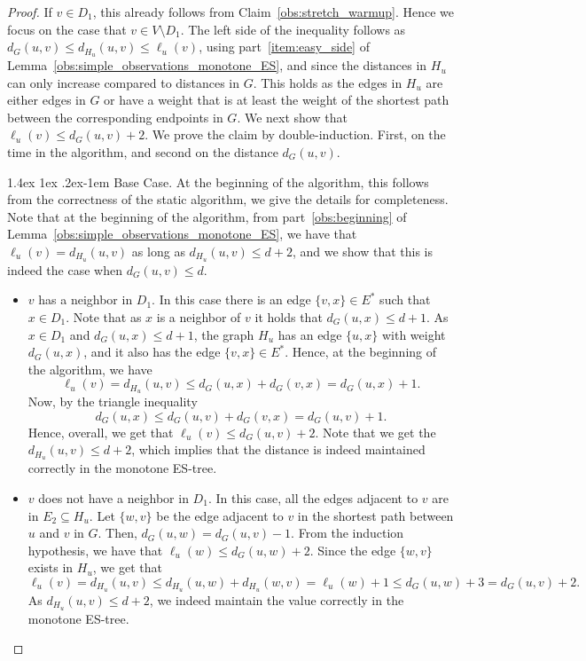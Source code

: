 \documentclass[11pt]{article}
\makeatletter
\theoremstyle{definition}
\theoremstyle{remark}
\renewcommand{\paragraph}{%
  \@startsection{paragraph}{4}%
  {\z@}{1.4ex \@plus 1ex \@minus .2ex}{-1em}%
  {\normalfont\normalsize\bfseries}%
}
\makeatother
\begin{document}
\begin{proof}
If $v \in D_1$, this already follows from Claim~\ref{obs:stretch_warmup}. Hence we focus on the case that $v \in V \setminus D_1$. The left side of the inequality follows as $d_G(u,v) \leq d_{H_u}(u,v) \leq \ell_u(v)$, using part~\ref{item:easy_side} of Lemma~\ref{obs:simple_observations_monotone_ES}, and since the distances in $H_u$ can only increase compared to distances in $G$. This holds as the edges in $H_u$ are either edges in $G$ or have a weight that is at least the weight of the shortest path between the corresponding endpoints in $G$.
We next show that $\ell_u(v) \leq d_G(u,v) +2$.
We prove the claim by double-induction. First, on the time in the algorithm, and second on the distance $d_G(u,v)$.

\paragraph{Base Case.} At the beginning of the algorithm, this follows from the correctness of the static algorithm, we give the details for completeness. Note that at the beginning of the algorithm, from part~\ref{obs:beginning} of Lemma~\ref{obs:simple_observations_monotone_ES}, we have that $\ell_u(v)=d_{H_u}(u,v)$ as long as $d_{H_u}(u,v) \leq d+2$, and we show that this is indeed the case when $d_G(u,v) \leq d$. 

\begin{itemize}
    \item [Case 1:] $v$ has a neighbor in $D_1$. In this case there is an edge $\{v,x\} \in E^*$ such that $x \in D_1$. Note that as $x$ is a neighbor of $v$ it holds that $d_G(u,x) \leq d+1$. As $x \in D_1$ and $d_G(u,x) \leq d+1$, the graph $H_u$ has an edge $\{u,x\}$ with weight $d_G(u,x)$, and it also has the edge $\{v,x\} \in E^*$. Hence, at the beginning of the algorithm, we have $$\ell_u(v) = d_{H_u}(u,v) \leq d_G(u,x) + d_G(v,x) = d_G(u,x)+1.$$ Now, by the triangle inequality $$d_G(u,x) \leq d_G(u,v)+d_G(v,x)=d_G(u,v)+1.$$ Hence, overall, we get that $\ell_u(v) \leq d_G(u,v) +2$. Note that we get the $d_{H_u}(u,v) \leq d+2$, which implies that the distance is indeed maintained correctly in the monotone ES-tree.
    \item [Case 2:] $v$ does not have a neighbor in $D_1$. In this case, all the edges adjacent to $v$ are in $E_2 \subseteq H_u$. Let $\{w,v\}$ be the edge adjacent to $v$ in the shortest path between $u$ and $v$ in $G$. Then, $d_G(u,w) = d_G(u,v)-1$. From the induction hypothesis, we have that $\ell_u(w) \leq d_G(u,w) +2$. Since the edge $\{w,v\}$ exists in $H_u$, we get that $$\ell_u(v) = d_{H_u}(u,v) \leq d_{H_u}(u,w) + d_{H_u}(w,v)= \ell_u(w)+1 \leq d_G(u,w)+3 = d_G(u,v) + 2.$$ As $d_{H_u}(u,v) \leq d+2$, we indeed maintain the value correctly in the monotone ES-tree.
\end{itemize}



\end{proof}
\end{document}
